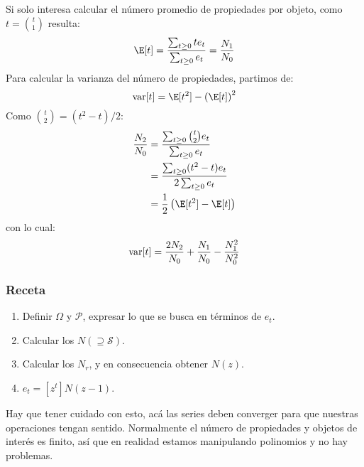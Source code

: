   Si solo interesa calcular
  el número promedio de propiedades por objeto,
  como \(t = \binom{t}{1}\) resulta:
  \begin{equation}
     \label{eq:E-t}
     \index{inclusion y exclusion, principio de@inclusión y exclusión, principio de!numero promedio de propiedades@número promedio de propiedades}
    \E[t]
      = \frac{\sum_{t \ge 0} t e_t}{\sum_{t \ge 0} e_t}
      = \frac{N_1}{N_0}
  \end{equation}
  Para calcular la varianza del número de propiedades,
  partimos de:
  \begin{equation*}
    \var[t]
      = \E[t^2] - \left( \E[t] \right)^2
  \end{equation*}
  Como \(\binom{t}{2} = (t^2 - t) / 2\):
  \begin{align*}
     \label{eq:Var-t}
     \index{inclusion y exclusion, principio de@inclusión y exclusión, principio de!varianza del numero de propiedades@varianza del número de propiedades}
    \frac{N_2}{N_0}
      &= \frac{\sum_{t \ge 0} \binom{t}{2} e_t}{\sum_{t \ge 0} e_t} \\
      &= \frac{\sum_{t \ge 0} (t^2 - t) e_t}{2 \sum_{t \ge 0} e_t} \\
      &= \frac{1}{2} \left( \E[t^2] - \E[t] \right)
  \end{align*}
  con lo cual:
  \begin{equation}
    \operatorname{var}[t]
      = \frac{2 N_2}{N_0} + \frac{N_1}{N_0} - \frac{N_1^2}{N_0^2}
  \end{equation}

\subsubsection*{Receta}

  \begin{enumerate}
  \item
    Definir \(\Omega\) y \(\mathcal{P}\),
    expresar lo que se busca en términos de \(e_t\).
  \item
    Calcular los \(N(\supseteq \mathcal{S})\).
  \item
    Calcular los \(N_r\),
    y en consecuencia obtener \(N(z)\).
  \item
    \(e_t = \left[ z^t \right] N(z - 1)\).
  \end{enumerate}

  Hay que tener cuidado con esto,
  acá las series deben converger
  para que nuestras operaciones tengan sentido.
  Normalmente el número de propiedades y objetos de interés
  es finito,
  así que en realidad estamos manipulando polinomios
  y no hay problemas.

